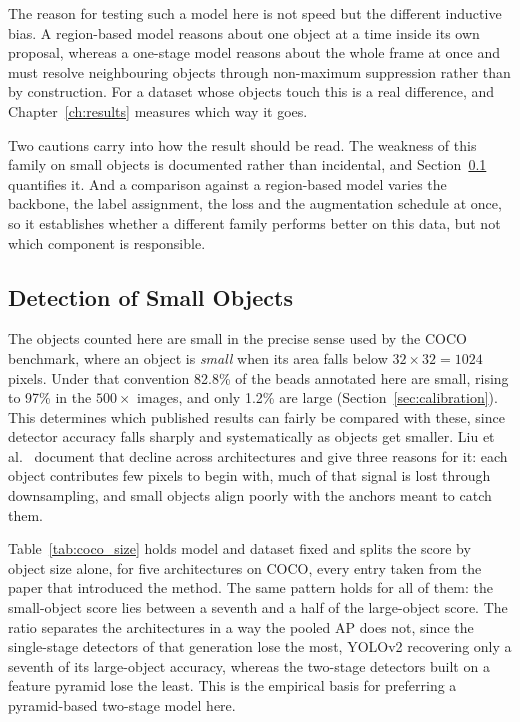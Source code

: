 The reason for testing such a model here is not speed but the different inductive
bias. A region-based model reasons about one object at a time inside its own
proposal, whereas a one-stage model reasons about the whole frame at once and must
resolve neighbouring objects through non-maximum suppression rather than by
construction. For a dataset whose objects touch this is a real
difference, and Chapter~\ref{ch:results} measures which way it goes.

Two cautions carry into how the result should be read. The weakness of this family
on small objects is documented rather than incidental, and
Section~\ref{sec:small_objects} quantifies it. And a comparison against a
region-based model varies the backbone, the label assignment, the loss and the
augmentation schedule at once, so it establishes whether a different family performs
better on this data, but not which component is responsible.

\subsection{Detection of Small Objects}
\label{sec:small_objects}

The objects counted here are small in the precise sense used by the COCO
benchmark, where an object is \emph{small} when its area falls below
$32 \times 32 = 1024$ pixels. Under that convention 82.8\% of the beads
annotated here are small, rising to 97\% in the $500\times$ images, and only
1.2\% are large (Section~\ref{sec:calibration}). This determines which published
results can fairly be compared with these, since detector accuracy falls sharply and
systematically as objects get smaller. Liu et al.\ \cite{liu2021survey} document
that decline across architectures and give three reasons for it: each object
contributes few pixels to begin with, much of that signal is lost through
downsampling, and small objects align poorly with the anchors meant to catch
them.

Table~\ref{tab:coco_size} holds model and dataset fixed and splits the score by
object size alone, for five architectures on COCO, every entry taken from the
paper that introduced the method. The same pattern holds for all of them: the
small-object score lies between a seventh and a half of the large-object score.
The ratio separates the architectures in a way the pooled AP does not, since the
single-stage detectors of that generation lose the most, YOLOv2 recovering only a
seventh of its large-object accuracy, whereas the two-stage detectors built on a
feature pyramid lose the least. This is the empirical basis for preferring a
pyramid-based two-stage model here.

